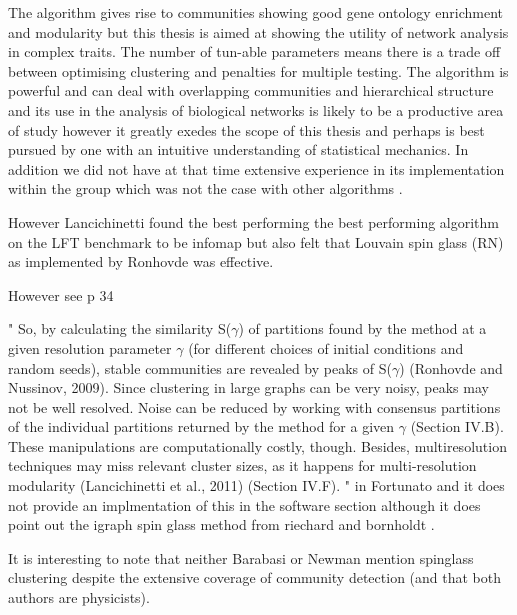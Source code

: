 The algorithm gives rise to communities showing good gene ontology enrichment and modularity but this thesis is aimed at showing the utility of network analysis in complex traits. The number of tun-able parameters means there is a trade off between optimising clustering and penalties for multiple testing. The algorithm is powerful and can deal with overlapping communities and hierarchical structure and its use in the analysis of biological networks is likely to be a productive area of study however it greatly exedes the scope of this thesis and perhaps is best pursued by one with an intuitive understanding of statistical mechanics. In addition we did not have at that time extensive experience in its implementation within the group which was not the case with other algorithms .

However Lancichinetti \cite{lancichinetti2009community} found the best performing the best performing algorithm on the LFT benchmark to be infomap but also felt that Louvain spin glass (RN) as implemented by Ronhovde \cite{ronhovde2009multiresolution} was effective. 

However see p 34

" So, by calculating the similarity S($\gamma$) of partitions found by the method at a given resolution parameter $\gamma$ (for different choices of initial conditions and
random seeds), stable communities are revealed by peaks
of S($\gamma$) (Ronhovde and Nussinov, 2009). Since clustering in large graphs can be very noisy, peaks may not be
well resolved. Noise can be reduced by working with consensus partitions of the individual partitions returned by
the method for a given $\gamma$ (Section IV.B). These manipulations are computationally costly, though. Besides, multiresolution techniques may miss relevant cluster sizes, as
it happens for multi-resolution modularity (Lancichinetti
et al., 2011) (Section IV.F).
"
in Fortunato \cite{fortunato2016community} and it does not provide an implmentation of this in the software section although it does point out the igraph spin glass method from riechard and bornholdt \cite{reichardt2006statistical}.

It is interesting to note that neither Barabasi \cite{barabasi2016network} or Newman \cite{newman2018networks} mention spinglass clustering despite the extensive coverage of community detection (and that both authors are physicists).

